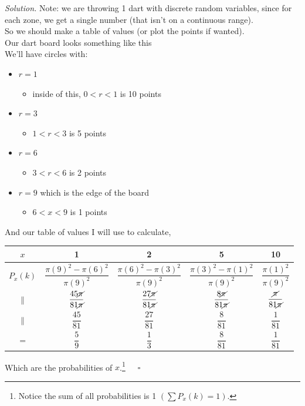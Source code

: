 \documentclass[12pt]{book}
\begin{document}
\noindent \textit{Solution. }
Note: we are throwing 1 dart with discrete random variables, since for each zone, we get a single number (that isn't on a continuous range).\\
So we should make a table of values (or plot the points if wanted).\\
Our dart board looks something like this\\
We'll have circles with:
\begin{itemize}
\item $r=1$
\begin{itemize}
\item inside of this, $0<r<1$ is 10 points
\end{itemize}
\item $r=3$
\begin{itemize}
\item $1<r<3$ is 5 points
\end{itemize}
\item $r=6$
\begin{itemize}
\item $3<r<6$ is 2 points
\end{itemize}
\item $r=9$ which is the edge of the board
\begin{itemize}
\item $6<x<9$ is 1 points
\end{itemize}
\end{itemize}

%
%
%
%
%
%
%
%
\noindent And our table of values I will use to calculate, 
\small
\begin{center}
\begin{tabular}{|c|c|c|c|c|}
\hline
	$x$ & 1 & 2 & 5 & 10 \\
\hline
 $P_{x}(k)$ & $\dfrac{\pi (9)^{2} - \pi (6)^{2}}{\pi (9)^{2}}$ & $\dfrac{\pi (6)^{2} - \pi (3)^{2}}{\pi (9)^{2}}$ & $\dfrac{\pi (3)^{2} - \pi (1)^{2}}{\pi (9)^{2}}$ & $\dfrac{\pi (1)^{2}}{\pi (9)^{2}}$   \\
\hline
	$\parallel$ & $\dfrac{45\cancel\pi}{81\cancel\pi}$           & $\dfrac{27\cancel\pi}{81\cancel\pi}$           & $\dfrac{8\cancel\pi}{81\cancel\pi}$            & $\dfrac{\cancel\pi}{81\cancel\pi}$ \\
\hline
	$\parallel$ & $\dfrac{45}{81}$ & $\dfrac{27}{81}$ & $\dfrac{8}{81}$ & $\dfrac{1}{81}$ \\
\hline
	$=$ & $\dfrac{5}{9}$ & $\dfrac{1}{3}$ & $\dfrac{8}{81}$ & $\dfrac{1}{81}$\\
\hline
\end{tabular}
\end{center}
\normalsize
Which are the probabilities of $x$.\footnote{Notice the sum of all probabilities is 1 $\left(\sum P_{x}(k)=1\right)$.}~~~$\square$
\end{document}
